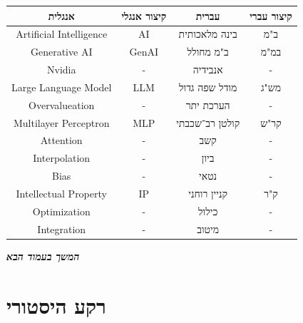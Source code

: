 \documentclass[]{article}
\newcommand\npage {\vfil {\hfil \textbf{\textit{המשך בעמוד הבא}}} \hfil \vfil \pagebreak}
\theoremstyle{definition}
\begin{document}
	\begin{center}
		\begin{tabular}{|c|c|c|c|}
			\hline אנגלית & קיצור אנגלי & עברית & קיצור עברי \\
			\hline Artificial Intelligence & AI & בינה מלאכותית & ב"מ \\
			\hline Generative AI & GenAI & ב"מ מחולל & במ"מ \\
			\hline Nvidia & - & אנבידיה & - \\
			\hline Large Language Model & LLM & מודל שפה גדול & מש"ג \\
			\hline Overvalueation & - & הערכת יתר & - \\
			\hline Multilayer Perceptron & MLP & קולטן רב־שכבתי & קר"ש \\
			\hline Attention & - & קשב & - \\
			\hline Interpolation & - & ביון & - \\
			\hline Bias & - & נטאי & - \\ 
			\hline Intellectual Property & IP & קניין רוחני & ק"ר \\
			\hline Optimization & - & כילול & - \\
			\hline Integration & - & מיטוב & - \\
			\hline
		\end{tabular}
	\end{center}
	
	
	\npage
	
	\section{רקע היסטורי}
\end{document}
